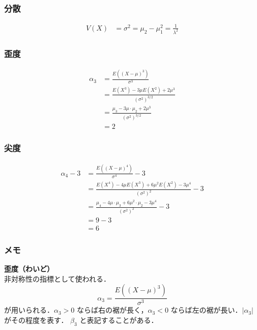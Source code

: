 \documentclass[titlepage,a4paper]{jsarticle}
\begin{document}
\subsubsection{分散}\label{3_7}
\begin{align}
  V(X) & = \sigma^2 = \mu_2 - \mu_1^2 = \frac{1}{\lambda^2}
\end{align}

\subsubsection{歪度}\label{3_8}
\begin{align}
  \alpha_3 & = \frac{E((X - \mu)^3)}{\sigma^3}                            \\
           & = \frac{E(X^3) - 3\mu E(X^2) + 2\mu^3}{(\sigma^2)^{3/2}}     \\
           & = \frac{\mu_3 - 3\mu \cdot \mu_2 + 2\mu^3}{(\sigma^2)^{3/2}} \\
           & = 2
\end{align}

\subsubsection{尖度}\label{3_9}
\begin{align}
  \alpha_4 - 3 & = \frac{E((X - \mu)^4)}{\sigma^4} - 3                                             \\
               & = \frac{E(X^4) - 4\mu E(X^3) + 6\mu^2 E(X^2) - 3\mu^4}{(\sigma^2)^2} - 3          \\
               & = \frac{\mu_4 - 4\mu \cdot \mu_3 + 6\mu^2 \cdot \mu_2 - 3\mu^4}{(\sigma^2)^2} - 3 \\
               & = 9 - 3                                                                           \\
               & = 6
\end{align}

\subsubsection*{メモ}
\textbf{歪度（わいど）} \\

非対称性の指標として使われる．
\[
  \alpha_3 = \frac{E((X - \mu)^3)}{\sigma^3}
\]
が用いられる．\(\alpha_3 > 0\) ならば右の裾が長く，\(\alpha_3 < 0\) ならば左の裾が長い．\(|\alpha_3|\) がその程度を表す．
\(\beta_3\) と表記することがある．
\end{document}
